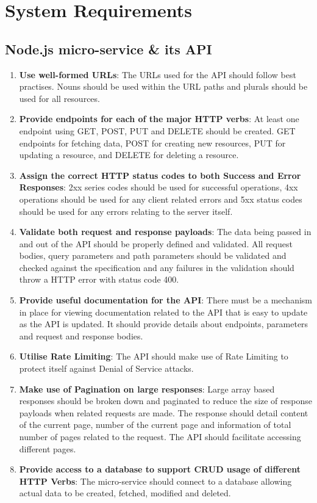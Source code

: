 \section{System Requirements}

\subsection{Node.js micro-service \& its API}
\begin{enumerate}
    \item \textbf{Use well-formed URLs}: The URLs used for the API should follow best practises. Nouns should be used within the URL paths and plurals should be used for all resources. 
    \item \textbf{Provide endpoints for each of the major HTTP verbs}: At least one endpoint using GET, POST, PUT and DELETE should be created. GET endpoints for fetching data, POST for creating new resources, PUT for updating a resource, and DELETE for deleting a resource. 
    \item \textbf{Assign the correct HTTP status codes to both Success and Error Responses}: 2xx series codes should be used for successful operations, 4xx operations should be used for any client related errors and 5xx status codes should be used for any errors relating to the server itself.
    \item \textbf{Validate both request and response payloads}: The data being passed in and out of the API should be properly defined and validated. All request bodies, query parameters and path parameters should be validated and checked against the specification and any failures in the validation should throw a HTTP error with status code 400.
    \item \textbf{Provide useful documentation for the API}: There must be a mechanism in place for viewing documentation related to the API that is easy to update as the API is updated. It should provide details about endpoints, parameters and request and response bodies. 
    \item \textbf{Utilise Rate Limiting}: The API should make use of Rate Limiting to protect itself against Denial of Service attacks.
    \item \textbf{Make use of Pagination on large responses}: Large array based responses should be broken down and paginated to reduce the size of response payloads when related requests are made. The response should detail content of the current page, number of the current page and information of total number of pages related to the request. The API should facilitate accessing different pages.
    \item \textbf{Provide access to a database to support CRUD usage of different HTTP Verbs}:  The micro-service should connect to a database allowing actual data to be created, fetched, modified and deleted.
\end{enumerate}

